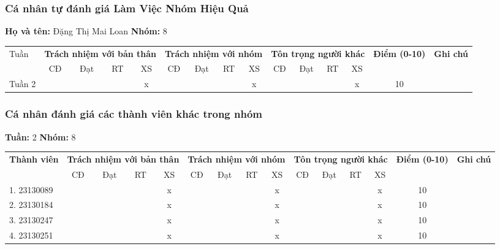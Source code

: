 \subsubsection*{Cá nhân tự đánh giá Làm Việc Nhóm Hiệu Quả}

\noindent \textbf{Họ và tên:} Đặng Thị Mai Loan \hrulefill \quad \textbf{Nhóm:} 8 \hrulefill

\vspace{0.5cm}

\begin{tabularx}{\linewidth}{|X|c|c|c|c|c|c|c|c|c|c|c|c|c|c|}
\hline
Tuần & \multicolumn{4}{c|}{\textbf{Trách nhiệm với bản thân}} & \multicolumn{4}{c|}{\textbf{Trách nhiệm với nhóm}} & \multicolumn{4}{c|}{\textbf{Tôn trọng người khác}} & \multirow{2}{1.5cm}{\textbf{Điểm (0-10)}} & \multirow{2}{1.5cm}{\textbf{Ghi chú}} \\ \cline{2-13}
 & CĐ & Đạt & RT & XS & CĐ & Đạt & RT & XS & CĐ & Đạt & RT & XS & & \\ \hline
  Tuần 2 & & & & x & & & & x & & & & x & 10 & \\ \hline
\end{tabularx}

\vspace{1cm}

\subsubsection*{Cá nhân đánh giá các thành viên khác trong nhóm}

\noindent \textbf{Tuần:} 2 \hrulefill \quad \textbf{Nhóm:} 8 \hrulefill

\vspace{0.5cm}

\begin{tabularx}{\linewidth}{|X|c|c|c|c|c|c|c|c|c|c|c|c|c|c|}
\hline
\multirow{2}{3cm}{\textbf{Thành viên}} & \multicolumn{4}{c|}{\textbf{Trách nhiệm với bản thân}} & \multicolumn{4}{c|}{\textbf{Trách nhiệm với nhóm}} & \multicolumn{4}{c|}{\textbf{Tôn trọng người khác}} & \multirow{2}{1.2cm}{\textbf{Điểm (0-10)}} & \multirow{2}{1.5cm}{\textbf{Ghi chú}} \\ \cline{2-13}
 & CĐ & Đạt & RT & XS & CĐ & Đạt & RT & XS & CĐ & Đạt & RT & XS & & \\ \hline
1. 23130089 & & & & x & & & & x & & & & x & 10 & \\ \hline
2. 23130184 & & & & x & & & & x & & & & x & 10 & \\ \hline
3. 23130247 & & & & x & & & & x & & & & x & 10 & \\ \hline
4. 23130251 & & & & x & & & & x & & & & x & 10 & \\ \hline
\end{tabularx}
